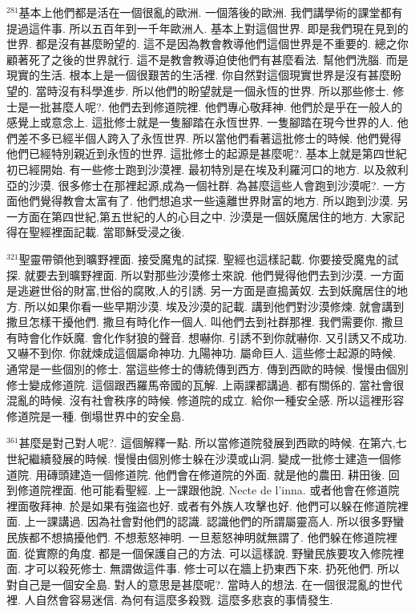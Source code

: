 \documentclass{book}
\begin{document}
$^{281}$基本上他們都是活在一個很亂的歐洲.
一個落後的歐洲.
我們講學術的課堂都有提過這件事.
所以五百年到一千年歐洲人.
基本上對這個世界.
即是我們現在見到的世界.
都是沒有甚麼盼望的.
這不是因為教會教導他們這個世界是不重要的.
總之你顧著死了之後的世界就行.
這不是教會教導迫使他們有甚麼看法.
幫他們洗腦.
而是現實的生活.
根本上是一個很艱苦的生活裡.
你自然對這個現實世界是沒有甚麼盼望的.
當時沒有科學進步.
所以他們的盼望就是一個永恆的世界.
所以那些修士.
修士是一批甚麼人呢?.
他們去到修道院裡.
他們專心敬拜神.
他們於是乎在一般人的感覺上或意念上.
這批修士就是一隻腳踏在永恆世界.
一隻腳踏在現今世界的人.
他們差不多已經半個人跨入了永恆世界.
所以當他們看著這批修士的時候.
他們覺得他們已經特別親近到永恆的世界.
這批修士的起源是甚麼呢?.
基本上就是第四世紀初已經開始.
有一些修士跑到沙漠裡.
最初特別是在埃及利羅河口的地方.
以及敘利亞的沙漠.
很多修士在那裡起源,成為一個社群.
為甚麼這些人會跑到沙漠呢?.
一方面他們覺得教會太富有了.
他們想追求一些遠離世界財富的地方.
所以跑到沙漠.
另一方面在第四世紀,第五世紀的人的心目之中.
沙漠是一個妖魔居住的地方.
大家記得在聖經裡面記載.
當耶穌受浸之後.

$^{321}$聖靈帶領他到曠野裡面.
接受魔鬼的試探.
聖經也這樣記載.
你要接受魔鬼的試探.
就要去到曠野裡面.
所以對那些沙漠修士來說.
他們覺得他們去到沙漠.
一方面是逃避世俗的財富,世俗的腐敗,人的引誘.
另一方面是直搗黃奴.
去到妖魔居住的地方.
所以如果你看一些早期沙漠.
埃及沙漠的記載.
講到他們對沙漠修煉.
就會講到撒旦怎樣干擾他們.
撒旦有時化作一個人.
叫他們去到社群那裡.
我們需要你.
撒旦有時會化作妖魔.
會化作豺狼的聲音.
想嚇你.
引誘不到你就嚇你.
又引誘又不成功.
又嚇不到你.
你就煉成這個屬命神功.
九陽神功.
屬命巨人.
這些修士起源的時候.
通常是一些個別的修士.
當這些修士的傳統傳到西方.
傳到西歐的時候.
慢慢由個別修士變成修道院.
這個跟西羅馬帝國的瓦解.
上兩課都講過.
都有關係的.
當社會很混亂的時候.
沒有社會秩序的時候.
修道院的成立.
給你一種安全感.
所以這裡形容修道院是一種.
倒塌世界中的安全島.

$^{361}$甚麼是對己對人呢?.
這個解釋一點.
所以當修道院發展到西歐的時候.
在第六,七世紀繼續發展的時候.
慢慢由個別修士躲在沙漠或山洞.
變成一批修士建造一個修道院.
用磚頭建造一個修道院.
他們會在修道院的外面.
就是他的農田.
耕田後.
回到修道院裡面.
他可能看聖經.
上一課跟他說.
Necte de l'inna.
或者他會在修道院裡面敬拜神.
於是如果有強盜也好.
或者有外族人攻擊也好.
他們可以躲在修道院裡面.
上一課講過.
因為社會對他們的認識.
認識他們的所謂屬靈高人.
所以很多野蠻民族都不想搞擾他們.
不想惹怒神明.
一旦惹怒神明就無謂了.
他們躲在修道院裡面.
從實際的角度.
都是一個保護自己的方法.
可以這樣說.
野蠻民族要攻入修院裡面.
才可以殺死修士.
無謂做這件事.
修士可以在牆上扔東西下來.
扔死他們.
所以對自己是一個安全島.
對人的意思是甚麼呢?.
當時人的想法.
在一個很混亂的世代裡.
人自然會容易迷信.
為何有這麼多殺戮.
這麼多悲哀的事情發生.
\end{document}

